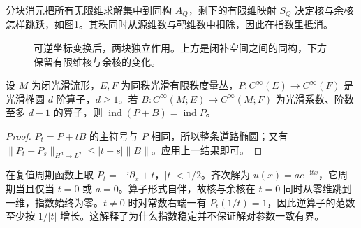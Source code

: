 分块消元把所有无限维求解集中到同构 \(A_Q\)，剩下的有限维映射 \(S_Q\) 决定核与余核怎样跳跃，如图\cref{g3:fig:fredholm-reduction}。其秩同时从源维数与靶维数中扣除，因此在指数里抵消。
\begin{figure}[htbp]
	\centering
	
	\caption[可逆部分与有限维剩余方程]{可逆坐标变换后，两块独立作用。上方是闭补空间之间的同构，下方保留有限维核与余核的变化。}
	\label{g3:fig:fredholm-reduction}
\end{figure}

\begin{corollary}\label{g3:cor:lower-order-index-invariance}
	设 \(M\) 为闭光滑流形，\(E,F\) 为同秩光滑有限秩度量丛，\(P:C^\infty(E)\to C^\infty(F)\) 是光滑椭圆 \(d\) 阶算子，\(d\ge1\)。若 \(B:C^\infty(M;E)\to C^\infty(M;F)\) 为光滑系数、阶数至多 \(d-1\) 的算子，则 \(\operatorname{ind}(P+B)=\operatorname{ind}P\)。
\end{corollary}
\begin{proof}
	\(P_t=P+tB\) 的主符号与 \(P\) 相同，所以整条道路椭圆；又有 \(\|P_t-P_s\|_{H^d\to L^2}\le |t-s|\|B\|\)。应用上一结果即可。
\end{proof}

\begin{example}\label{g3:exm:kernel-jump-circle}
	在复值周期函数上取 \(P_t=-\mathrm i\partial_x+t\)，\(|t|<1/2\)。齐次解为 \(u(x)=a e^{-\mathrm itx}\)，它周期当且仅当 \(t=0\) 或 \(a=0\)。算子形式自伴，故核与余核在 \(t=0\) 同时从零维跳到一维，指数始终为零。\(t\ne0\) 时对常数右端一有 \(P_t(1/t)=1\)，因此逆算子的范数至少按 \(1/|t|\) 增长。这解释了为什么指数稳定并不保证解对参数一致有界。
\end{example}
